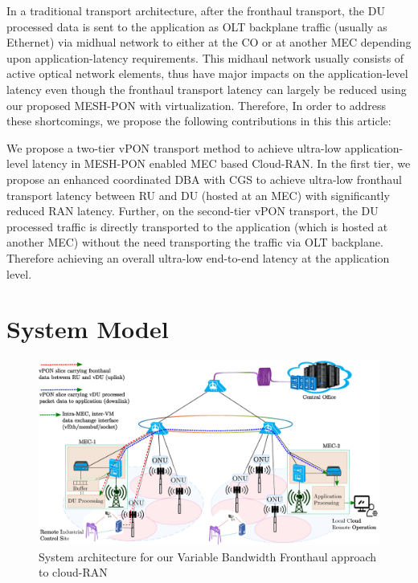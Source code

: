 \documentclass[a4paper, oneside, twocolumn, notitlepage, 10pt]{extarticle_ecoc}
\begin{document}
 	In a traditional transport architecture, after the fronthaul transport, the \ac{DU} processed data is sent to the application as OLT backplane traffic (usually as Ethernet) via midhual network to either at the \ac{CO} or at another \ac{MEC} depending upon application-latency requirements. This midhaul network usually consists of active optical network elements, thus have major impacts on the application-level latency even though the fronthaul transport latency can largely be reduced using our proposed MESH-PON with virtualization\cite{MESH-PON}. Therefore, In order to address these shortcomings, we propose the following contributions in this this article:
 	
 	We propose a two-tier vPON transport method to achieve ultra-low application-level latency in MESH-PON enabled MEC based Cloud-RAN. In the first tier, we propose an enhanced coordinated DBA with CGS to achieve ultra-low fronthaul transport latency between RU and DU (hosted at an MEC) with significantly reduced RAN latency. Further, on the second-tier vPON transport, the DU processed traffic is directly transported to the application (which is hosted at another MEC) without the need transporting the traffic via OLT backplane. Therefore achieving an overall ultra-low end-to-end latency at the application level.
	
    
\section{System Model} \label{sec:SystemModel}
	\begin{figure}[h]
		\includegraphics[clip, trim={0, 0, 0, 0}, width=\linewidth]{./Figures/SystemArc}
		\caption{System architecture for our Variable Bandwidth Fronthaul approach to cloud-RAN}
		\label{fig:SystemArc}
	\end{figure}
\end{document}
